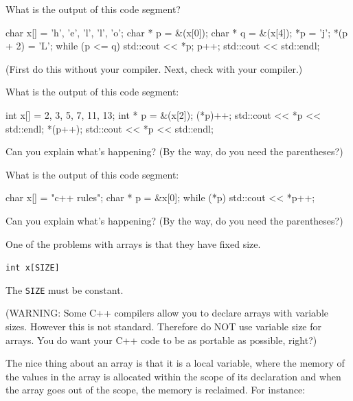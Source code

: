 \begin{ex}
What is the output of this code segment?

\begin{consolethree}[escapeinside=||]
char x[] = {'h', 'e', 'l', 'l', 'o'};
char * p = &(x[0]);
char * q = &(x[4]);
*p = 'j';
*(p + 2) = 'L';
while (p <= q)
{
    std::cout << *p;
    p++;
}
std::cout << std::endl;
\end{consolethree}

(First do this without your compiler. Next, check with your compiler.)
\end{ex}

\begin{ex}
What is the output of this code segment:

\begin{consolethree}[escapeinside=||]
int x[] = {2, 3, 5, 7, 11, 13};
int * p = &(x[2]);
(*p)++;
std::cout << *p << std::endl;
*(p++);
std::cout << *p << std::endl;
\end{consolethree}

Can you explain what's happening? (By the way, do you need the
parentheses?)
\end{ex}

\begin{ex}
What is the output of this code segment:

\begin{consolethree}[escapeinside=||]
char x[] = "c++ rules";
char * p = &x[0];
while (*p)
{
    std::cout << *p++;
}
\end{consolethree}

Can you explain what's happening? (By the way, do you need the
parentheses?)
\end{ex}


\newpage{}

One of the problems with arrays is that they have fixed size.

\verb!int x[SIZE]!

The \texttt{SIZE} must be constant.

(WARNING: Some C++ compilers allow you to declare arrays with variable
sizes. However this is not standard. Therefore do NOT use variable size
for arrays. You do want your C++ code to be as portable as possible,
right?)

The nice thing about an array is that it is a local variable, where the
memory of the values in the array is allocated within the scope of its
declaration and when the array goes out of the scope, the memory is
reclaimed. For instance:

